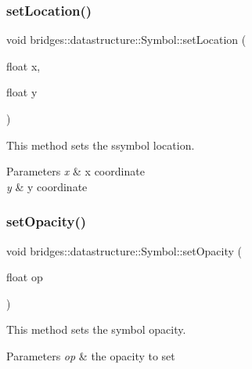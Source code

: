 \subsubsection{\texorpdfstring{set\+Location()}{setLocation()}\hspace{0.1cm}{\footnotesize\ttfamily [3/3]}}
{\footnotesize\ttfamily void bridges\+::datastructure\+::\+Symbol\+::set\+Location (\begin{DoxyParamCaption}\item[{float}]{x,  }\item[{float}]{y }\end{DoxyParamCaption})\hspace{0.3cm}{\ttfamily [inline]}}



This method sets the ssymbol location. 


\begin{DoxyParams}{Parameters}
{\em x} & x coordinate \\
\hline
{\em y} & y coordinate \\
\hline
\end{DoxyParams}
\mbox{\label{classbridges_1_1datastructure_1_1_symbol_a889bace56d39df0ac09ba408ca868b7d}} 
\subsubsection{\texorpdfstring{set\+Opacity()}{setOpacity()}}
{\footnotesize\ttfamily void bridges\+::datastructure\+::\+Symbol\+::set\+Opacity (\begin{DoxyParamCaption}\item[{float}]{op }\end{DoxyParamCaption})\hspace{0.3cm}{\ttfamily [inline]}}



This method sets the symbol opacity. 


\begin{DoxyParams}{Parameters}
{\em op} & the opacity to set \\
\hline
\end{DoxyParams}
\mbox{\label{classbridges_1_1datastructure_1_1_symbol_add56ff3bb5b276c016cfe377ff0f3fe2}} 
